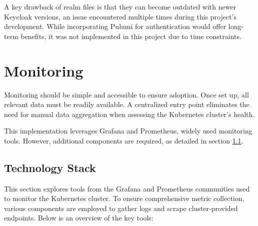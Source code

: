 A key drawback of realm files is that they can become outdated with newer Keycloak versions, an issue encountered multiple times during this project's development. While incorporating Pulumi for authentication would offer long-term benefits, it was not implemented in this project due to time constraints.

\section{Monitoring}
Monitoring should be simple and accessible to ensure adoption. Once set up, all relevant data must be readily available. A centralized entry point eliminates the need for manual data aggregation when assessing the Kubernetes cluster's health.

This implementation leverages Grafana and Prometheus, widely used monitoring tools. However, additional components are required, as detailed in section \ref{sec:technology_stack}.

\subsection{Technology Stack}\label{sec:technology_stack}
This section explores tools from the Grafana and Prometheus communities used to monitor the Kubernetes cluster. To ensure comprehensive metric collection, various components are employed to gather logs and scrape cluster-provided endpoints. Below is an overview of the key tools:


